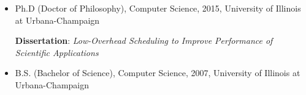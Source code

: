 \begin{itemize}[itemsep=-0.1em]
    \item  Ph.D (Doctor of Philosophy), Computer Science, 2015, University of Illinois at Urbana-Champaign
    
    \textbf{Dissertation}: \textit{Low-Overhead Scheduling to Improve Performance of Scientific Applications} 
   \item B.S. (Bachelor of Science), Computer Science, 2007, University of Illinois at Urbana-Champaign
\end{itemize}